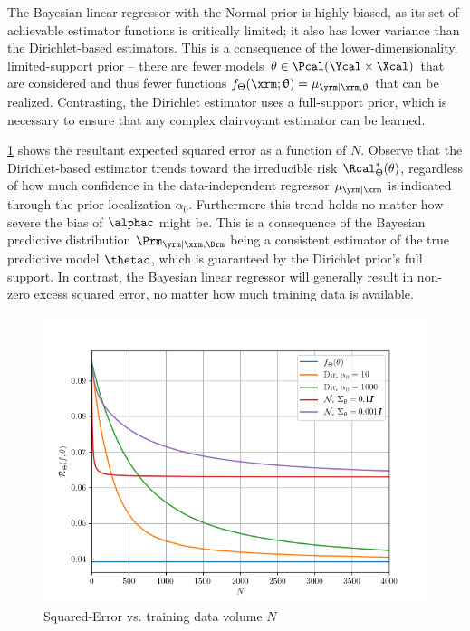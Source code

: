 \documentclass[12pt]{report}
\begin{document}
The Bayesian linear regressor with the Normal prior is highly biased, as its set of achievable estimator functions is critically limited; it also has lower variance than the Dirichlet-based estimators. This is a consequence of the lower-dimensionality, limited-support prior -- there are fewer models $\theta \in \Pcal(\Ycal \times \Xcal)$ that are considered and thus fewer functions $f_{\Theta}(\xrm;\uptheta) = \mu_{\yrm | \xrm,\uptheta}$ that can be realized. Contrasting, the Dirichlet estimator uses a full-support prior, which is necessary to ensure that any complex clairvoyant estimator can be learned.

\cref{fig:Discrete/SE/risk_N_leg_a0} shows the resultant expected squared error as a function of $N$. Observe that the Dirichlet-based estimator trends toward the irreducible risk $\Rcal_{\Theta}^*(\theta)$, regardless of how much confidence in the data-independent regressor $\mu_{\yrm | \xrm}$ is indicated through the prior localization $\alpha_0$. Furthermore this trend holds no matter how severe the bias of $\alphac$ might be. This is a consequence of the Bayesian predictive distribution $\Prm_{\yrm | \xrm,\Drm}$ being a consistent estimator of the true predictive model $\thetac$, which is guaranteed by the Dirichlet prior's full support. In contrast, the Bayesian linear regressor will generally result in non-zero excess squared error, no matter how much training data is available. 
\begin{figure}
	\centering
	\includegraphics[width=0.8\linewidth]{Discrete/SE/risk_N_leg_a0.png}
	\caption{Squared-Error vs. training data volume $N$}
	\label{fig:Discrete/SE/risk_N_leg_a0}
\end{figure}
\end{document}
